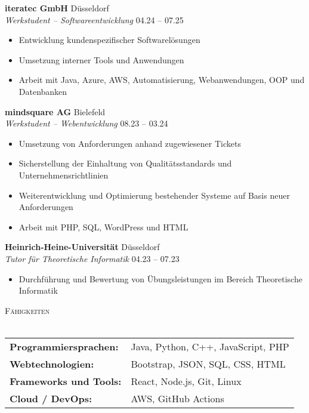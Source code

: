 \documentclass[a4paper]{article}
\newcommand{\lineunder} {
    \vspace*{-8pt} \\
    \hspace*{-18pt} \hrulefill \\
}
\newcommand{\header} [1] {
    {\hspace*{-18pt}\vspace*{6pt} \textsc{#1}}
    \vspace*{-6pt} \lineunder
}
\begin{document}
\textbf{iteratec GmbH} \hfill Düsseldorf\\
\textit{Werkstudent – Softwareentwicklung} \hfill 04.24 – 07.25\\
\vspace{-5mm}
\begin{itemize} \itemsep -1pt
    \item Entwicklung kundenspezifischer Softwarelösungen
    \item Umsetzung interner Tools und Anwendungen
    \item Arbeit mit Java, Azure, AWS, Automatisierung, Webanwendungen, OOP und Datenbanken
\end{itemize}
\vspace{3mm}
\textbf{mindsquare AG} \hfill Bielefeld\\
\textit{Werkstudent – Webentwicklung} \hfill 08.23 – 03.24\\
\vspace{-5mm}
\begin{itemize} \itemsep -1pt
    \item Umsetzung von Anforderungen anhand zugewiesener Tickets
    \item Sicherstellung der Einhaltung von Qualitätsstandards und Unternehmensrichtlinien
    \item Weiterentwicklung und Optimierung bestehender Systeme auf Basis neuer Anforderungen
    \item Arbeit mit PHP, SQL, WordPress und HTML
\end{itemize}
\vspace{3mm}
\textbf{Heinrich-Heine-Universität} \hfill Düsseldorf\\
\textit{Tutor für Theoretische Informatik} \hfill 04.23 – 07.23\\
\vspace{-5mm}
\begin{itemize} \itemsep -1pt
    \item Durchführung und Bewertung von Übungsleistungen im Bereich Theoretische Informatik
\end{itemize}
\vspace{8mm}


\header{Fähigkeiten}
\begin{tcolorbox}[myprojectbox]
\vspace{2mm}
\begin{tabular}{ l l }
    \textbf{Programmiersprachen:} & Java, Python, C++, JavaScript, PHP\\[6pt]
    \textbf{Webtechnologien:} & Bootstrap, JSON, SQL, CSS, HTML \\[6pt]
    \textbf{Frameworks und Tools:} & React, Node.js, Git, Linux \\[6pt]
    \textbf{Cloud / DevOps:} & AWS, GitHub Actions \\[6pt]
\end{tabular}
\end{tcolorbox}
\end{document}
